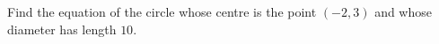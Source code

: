 Find the equation of the circle whose centre is the point $(-2,3)$ and whose diameter has length $10$.

